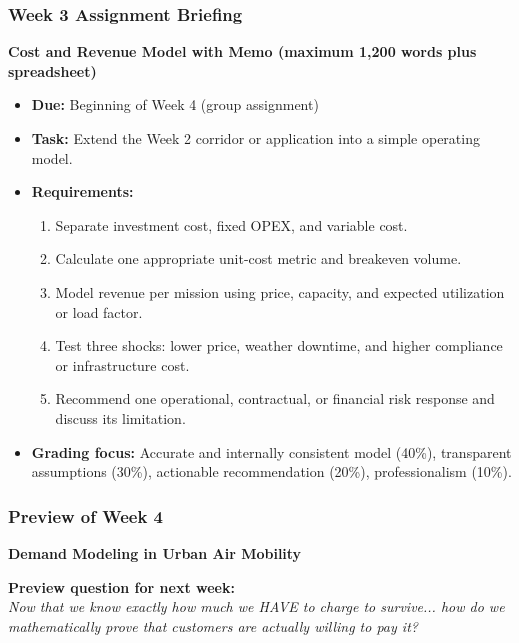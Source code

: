 \documentclass{beamer}
\begin{document}
\begin{frame}[t]
  \frametitle{Week 3 Assignment Briefing}
  \textbf{Cost and Revenue Model with Memo (maximum 1,200 words plus spreadsheet)}
  \begin{itemize}
    \item \textbf{Due:} Beginning of Week 4 (group assignment)
    \item \textbf{Task:} Extend the Week 2 corridor or application into a simple operating model.
    \item \textbf{Requirements:}
    \begin{enumerate}
      \item Separate investment cost, fixed OPEX, and variable cost.
      \item Calculate one appropriate unit-cost metric and breakeven volume.
      \item Model revenue per mission using price, capacity, and expected utilization or load factor.
      \item Test three shocks: lower price, weather downtime, and higher compliance or infrastructure cost.
      \item Recommend one operational, contractual, or financial risk response and discuss its limitation.
    \end{enumerate}
    \item \textbf{Grading focus:} Accurate and internally consistent model (40\%), transparent assumptions (30\%), actionable recommendation (20\%), professionalism (10\%).
  \end{itemize}
\end{frame}

\begin{frame}[t]
  \frametitle{Preview of Week 4}
  
  \begin{center}
      \Large \textbf{Demand Modeling in Urban Air Mobility}
  \end{center}
  
  \vspace{1cm}
  \textbf{Preview question for next week:} \\
  \textit{Now that we know exactly how much we HAVE to charge to survive... how do we mathematically prove that customers are actually willing to pay it?}
\end{frame}
\end{document}
